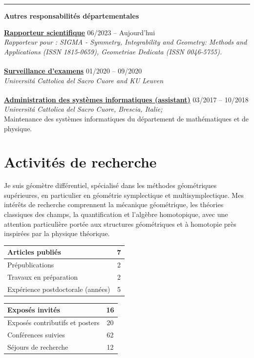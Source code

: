 \documentclass[a4paper]{article}
\newcommand{\block}[1]{\hrule \vspace{0.2cm} \textbf{\Large #1} \vspace{0.2cm}}
\newcommand{\voice}[5]{\href{#4}{\textbf{#1}} \hfill #2 \\ \textit{#3} \\ {\small #5} \vspace{0.2cm} \\}
\newcommand{\txt}[1]{#1\\}
\begin{document}
	\block{Autres responsabilités départementales}

	\voice{Rapporteur scientifique}
		{06/2023 -- Aujourd'hui}
		{Rapporteur pour : SIGMA - Symmetry, Integrability and Geometry: Methods and Applications (ISSN 1815-0659), Geometriae Dedicata (ISSN 0046-5755).}
		{}
        {\vspace{-0.5cm}}
	\voice{Surveillance d'examens}
		{01/2020 -- 09/2020}
		{Universit\'a Cattolica del Sacro Cuore and KU Leuven}
		{}
		{\vspace{-0.5cm}}
	\voice{Administration des systèmes informatiques (assistant)}
		{03/2017 -- 10/2018}
		{Universit\'a Cattolica del Sacro Cuore, Brescia, Italie;}
		{https://dipartimenti.unicatt.it/dmf-home}
		{Maintenance des systèmes informatiques du département de mathématiques et de physique.}

	\clearpage
	\section*{Activités de recherche}

	\txt{Je suis géomètre différentiel, spécialisé dans les méthodes géométriques supérieures, en particulier en géométrie symplectique et multisymplectique. Mes intérêts de recherche comprennent la mécanique géométrique, les théories classiques des champs, la quantification et l'algèbre homotopique, avec une attention particulière portée aux structures géométriques et à homotopie près inspirées par la physique théorique. }

		\begin{minipage}[t]{0.45\columnwidth}
		\center
	\begin{tabularx}{\linewidth}{|X|c|}
	\hline

	Articles publiés & 7 \\
	\hline

	Prépublications & 2 \\
	\hline

	Travaux en préparation & 2 \\
	\hline

	Expérience postdoctorale (années) & 5 \\
	\hline

	\end{tabularx}
		\end{minipage}
		\hfill
		\begin{minipage}[t]{0.45\columnwidth}
		\center
	\begin{tabularx}{\linewidth}{|X|c|}
	\hline

	Exposés invités & 16 \\
	\hline

	Exposés contributifs et posters & 20 \\
	\hline

	Conférences suivies & 62 \\
	\hline

	Séjours de recherche & 12 \\
	\hline

	\end{tabularx}
		\end{minipage}
	\vspace{1em}
\end{document}
